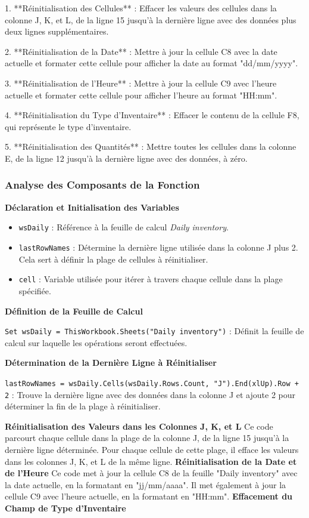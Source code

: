 \documentclass[a4paper, oneside, 12pt, final]{extreport}
\begin{document}
1. **Réinitialisation des Cellules** : Effacer les valeurs des cellules dans la colonne J, K, et L, de la ligne 15 jusqu'à la dernière ligne avec des données plus deux lignes supplémentaires.

2. **Réinitialisation de la Date** : Mettre à jour la cellule C8 avec la date actuelle et formater cette cellule pour afficher la date au format "dd/mm/yyyy".

3. **Réinitialisation de l'Heure** : Mettre à jour la cellule C9 avec l'heure actuelle et formater cette cellule pour afficher l'heure au format "HH:mm".

4. **Réinitialisation du Type d'Inventaire** : Effacer le contenu de la cellule F8, qui représente le type d'inventaire.

5. **Réinitialisation des Quantités** : Mettre toutes les cellules dans la colonne E, de la ligne 12 jusqu'à la dernière ligne avec des données, à zéro.

\subsubsection{Analyse des Composants de la Fonction}

\textbf{Déclaration et Initialisation des Variables}

\begin{itemize}
    \item \texttt{wsDaily} : Référence à la feuille de calcul \textit{Daily inventory}.
    \item \texttt{lastRowNames} : Détermine la dernière ligne utilisée dans la colonne J plus 2. Cela sert à définir la plage de cellules à réinitialiser.
    \item \texttt{cell} : Variable utilisée pour itérer à travers chaque cellule dans la plage spécifiée.
\end{itemize}

\textbf{Définition de la Feuille de Calcul}

\texttt{Set wsDaily = ThisWorkbook.Sheets("Daily inventory")} : Définit la feuille de calcul sur laquelle les opérations seront effectuées.

\textbf{Détermination de la Dernière Ligne à Réinitialiser}

\texttt{lastRowNames = wsDaily.Cells(wsDaily.Rows.Count, "J").End(xlUp).Row + 2} : Trouve la dernière ligne avec des données dans la colonne J et ajoute 2 pour déterminer la fin de la plage à réinitialiser.

\textbf{Réinitialisation des Valeurs dans les Colonnes J, K, et L}
Ce code parcourt chaque cellule dans la plage de la colonne J, de la ligne 15 jusqu'à la dernière ligne déterminée. Pour chaque cellule de cette plage, il efface les valeurs dans les colonnes J, K, et L de la même ligne.
\textbf{Réinitialisation de la Date et de l’Heure}
Ce code met à jour la cellule C8 de la feuille "Daily inventory" avec la date actuelle, en la formatant en "jj/mm/aaaa". Il met également à jour la cellule C9 avec l'heure actuelle, en la formatant en "HH:mm".
\textbf{Effacement du Champ de Type d'Inventaire}
\end{document}
